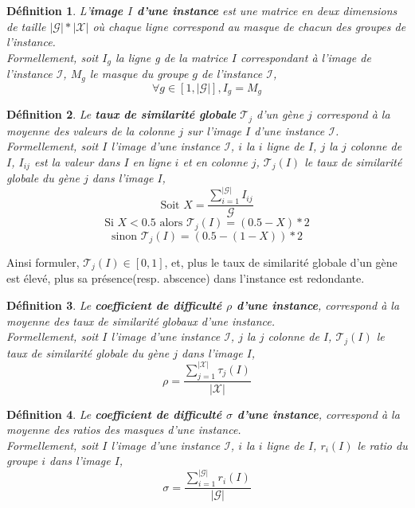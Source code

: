 \documentclass[a4paper,10pt]{article}
\newtheorem{definition}{Définition}
\begin{document}
\begin{definition}
L'\textbf{image $I$ d'une instance} est une matrice en deux dimensions de taille $|\mathcal{G}|*|\mathcal{X}|$ où chaque ligne correspond au masque de chacun des groupes de l'instance.\\
Formellement, soit $I_g$ la ligne g de la matrice $I$ correspondant à l'image de l'instance $\mathcal{I}$, $M_g$ le masque du groupe $g$ de l'instance $\mathcal{I}$,
$$\forall g \in [1,|\mathcal{G}|], I_g=M_g$$
\end{definition}


\begin{definition}
Le \textbf{taux de similarité globale} $\mathcal{T}_j$ d'un gène $j$ correspond à la moyenne des valeurs de la colonne $j$ sur l'image $I$ d'une instance $\mathcal{I}$.\\
Formellement, soit $I$ l'image d'une instance $\mathcal{I}$, $i$ la $i$ ligne de $I$, $j$ la $j$ colonne de $I$, $I_{ij}$ est la valeur dans $I$ en ligne $i$ et en colonne $j$, $\mathcal{T}_j(I)$ le taux de similarité globale du gène $j$ dans l'image $I$,
$$ \text{Soit } X=\frac{\sum_{i=1}^{|\mathcal{G}|} I_{ij}}{\mathcal{G}} $$ 
$$\text{Si } X<0.5 \text{ alors } \mathcal{T}_j(I)=(0.5-X)*2 $$
$$\text{sinon }\mathcal{T}_j(I)=(0.5-(1-X))*2$$ 
\end{definition}
Ainsi formuler, $\mathcal{T}_j(I) \in [0,1]$, et, plus le taux de similarité globale d'un gène est élevé, plus sa présence(resp. abscence) dans l'instance est redondante.

\begin{definition}
Le \textbf{coefficient de difficulté $\rho$ d'une instance}, correspond à la moyenne des taux de similarité globaux d'une instance.\\
Formellement, soit $I$ l'image d'une instance $\mathcal{I}$, $j$ la $j$ colonne de $I$, $\mathcal{T}_j(I)$ le taux de similarité globale du gène $j$ dans l'image $I$,
$$ \rho=\frac{\sum_{j=1}^{|\mathcal{X}|}\tau_j(I)}{|\mathcal{X}|} $$
\end{definition}

\begin{definition}
Le \textbf{coefficient de difficulté $\sigma$ d'une instance}, correspond à la moyenne des ratios des masques d'une instance.\\
Formellement, soit $I$ l'image d'une instance $\mathcal{I}$, $i$ la $i$ ligne de $I$, $r_i(I)$ le ratio du groupe $i$ dans l'image $I$,
$$ \sigma=\frac{\sum_{i=1}^{|\mathcal{G}|}r_i(I)} {|\mathcal{G}|} $$
\end{definition}
\end{document}
